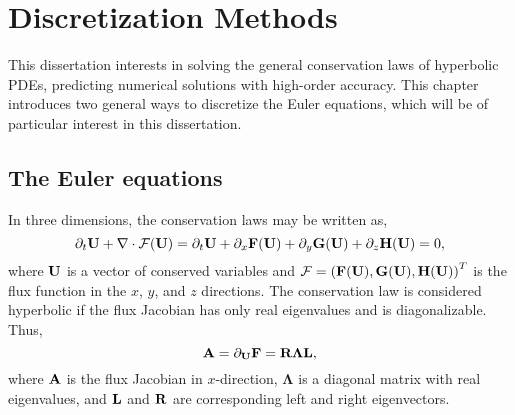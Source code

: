 \chapter{Discretization Methods}\label{chap:discrete_methods}

This dissertation interests in solving the general conservation laws of hyperbolic PDEs,
predicting numerical solutions with high-order accuracy.
This chapter introduces two general ways to discretize the Euler equations,
which will be of particular interest in this dissertation.

\section{The Euler equations}\label{sec:euler_eqns}

In three dimensions, the conservation laws may be written as,
\begin{equation}\label{eq:gov}
    \partial_{t} \mathbf{U} + \nabla \cdot \mathcal{F}(\mathbf{U})
    = \partial_{t} \mathbf{U} + \partial_{x} \mathbf{F} (\mathbf{U}) + \partial_{y} \mathbf{G} (\mathbf{U}) + \partial_{z} \mathbf{H} (\mathbf{U}) = 0,
\end{equation}
where \( \mathbf{U} \) is a vector of conserved variables and
\( \mathcal{F} = {(\mathbf{F} (\mathbf{U}), \mathbf{G} (\mathbf{U}), \mathbf{H} (\mathbf{U}))}^{T} \) is the flux function
in the \( x \), \( y \), and \( z \) directions.
The conservation law is considered hyperbolic
if the flux Jacobian has only real eigenvalues and is diagonalizable. Thus,
\begin{equation}\label{eq:hyperbolic}
    \mathbf{A} = \partial_{\mathbf{U}} \mathbf{F} = \mathbf{R} \mathbf{\Lambda} \mathbf{L},
\end{equation}
where \( \mathbf{A} \) is the flux Jacobian in \( x \)-direction,
\( \mathbf{\Lambda} \) is a diagonal matrix with real eigenvalues, and
\( \mathbf{L} \) and \( \mathbf{R} \) are corresponding left and right eigenvectors.

